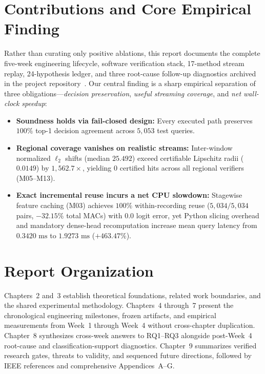 \documentclass[11pt,oneside,a4paper]{report}
\newcommand{\code}[1]{{\small\upshape\ttfamily #1}}
\theoremstyle{remark}
\begin{document}
\section{Contributions and Core Empirical Finding}
Rather than curating only positive ablations, this report documents the complete five-week engineering lifecycle, software verification stack, 17-method stream replay, 24-hypothesis ledger, and three root-cause follow-up diagnostics archived in the project repository~\cite{repo}. Our central finding is a sharp empirical separation of three obligations—\emph{decision preservation}, \emph{useful streaming coverage}, and \emph{net wall-clock speedup}:
\begin{itemize}[leftmargin=1.5em]
  \item \textbf{Soundness holds via fail-closed design:} Every executed path preserves $100\%$ top-1 decision agreement across $5,053$ test queries.
  \item \textbf{Regional coverage vanishes on realistic streams:} Inter-window normalized $\ell_2$ shifts (median $25.492$) exceed certifiable Lipschitz radii ($0.0149$) by $1,562.7\times$, yielding $0$ certified hits across all regional verifiers (\code{M05}--\code{M13}).
  \item \textbf{Exact incremental reuse incurs a net CPU slowdown:} Stagewise feature caching (\code{M03}) achieves $100\%$ within-recording reuse ($5,034/5,034$ pairs, $-32.15\%$ total MACs) with $0.0$ logit error, yet Python slicing overhead and mandatory dense-head recomputation increase mean query latency from $0.3420\text{ ms}$ to $1.9273\text{ ms}$ ($+463.47\%$).
\end{itemize}

\section{Report Organization}
Chapters~2 and~3 establish theoretical foundations, related work boundaries, and the shared experimental methodology. Chapters~4 through~7 present the chronological engineering milestones, frozen artifacts, and empirical measurements from Week~1 through Week~4 without cross-chapter duplication. Chapter~8 synthesizes cross-week answers to RQ1--RQ3 alongside post-Week~4 root-cause and classification-support diagnostics. Chapter~9 summarizes verified research gates, threats to validity, and sequenced future directions, followed by IEEE references and comprehensive Appendices~A--G.

\end{document}
